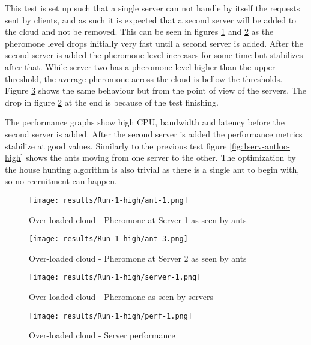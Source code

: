 This test is set up such that a single server can not handle by itself the requests sent by clients, and as such it is expected that a second server will be added to the cloud and not be removed. This can be seen in figures \ref{fig:1serv-ant1-high} and \ref{fig:1serv-ant3-high} as the pheromone level drops initially very fast until a second server is added. After the second server is added the pheromone level increases for some time but stabilizes after that. While server two has a pheromone level higher than the upper threshold, the average pheromone across the cloud is bellow the thresholds. Figure \ref{fig:1serv-pher-high} shows the same behaviour but from the point of view of the servers. The drop in figure \ref{fig:1serv-ant3-high} at the end is because of the test finishing.

The performance graphs show high CPU, bandwidth and latency before the second server is added. After the second server is added the performance metrics stabilize at good values. Similarly to the previous test figure \ref{fig:1serv-antloc-high} shows the ants moving from one server to the other. The optimization by the house hunting algorithm is also trivial as there is a single ant to begin with, so no recruitment can happen.

\begin{figure}[!h]
	\centering
		\texttt{[image: results/Run-1-high/ant-1.png]}
	\caption{Over-loaded cloud - Pheromone at Server 1 as seen by ants}
	\label{fig:1serv-ant1-high}
\end{figure}

\begin{figure}
	\centering
		\texttt{[image: results/Run-1-high/ant-3.png]}
	\caption{Over-loaded cloud - Pheromone at Server 2 as seen by ants}
	\label{fig:1serv-ant3-high}
\end{figure}

\begin{figure}
	\centering
		\texttt{[image: results/Run-1-high/server-1.png]}
	\caption{Over-loaded cloud - Pheromone as seen by servers}
	\label{fig:1serv-pher-high}
\end{figure}

\begin{figure}
	\centering
		\texttt{[image: results/Run-1-high/perf-1.png]}
	\caption{Over-loaded cloud - Server performance}
	\label{fig:1serv-perf-high}
\end{figure}

